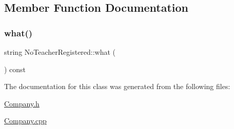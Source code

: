 \subsection{Member Function Documentation}
\mbox{\label{class_no_teacher_registered_af81eb37b6a596d865c3a63d9900345a1}} 
\subsubsection{\texorpdfstring{what()}{what()}}
{\footnotesize\ttfamily string No\+Teacher\+Registered\+::what (\begin{DoxyParamCaption}{ }\end{DoxyParamCaption}) const}



The documentation for this class was generated from the following files\+:\begin{DoxyCompactItemize}
\item 
\mbox{\hyperlink{_company_8h}{Company.\+h}}\item 
\mbox{\hyperlink{_company_8cpp}{Company.\+cpp}}\end{DoxyCompactItemize}
